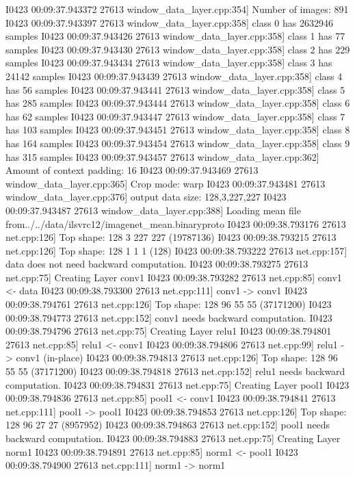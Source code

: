 \documentclass{article}
\begin{document}
I0423 00:09:37.943372 27613 window_data_layer.cpp:354] Number of images: 891
I0423 00:09:37.943397 27613 window_data_layer.cpp:358] class 0 has 2632946 samples
I0423 00:09:37.943426 27613 window_data_layer.cpp:358] class 1 has 77 samples
I0423 00:09:37.943430 27613 window_data_layer.cpp:358] class 2 has 229 samples
I0423 00:09:37.943434 27613 window_data_layer.cpp:358] class 3 has 24142 samples
I0423 00:09:37.943439 27613 window_data_layer.cpp:358] class 4 has 56 samples
I0423 00:09:37.943441 27613 window_data_layer.cpp:358] class 5 has 285 samples
I0423 00:09:37.943444 27613 window_data_layer.cpp:358] class 6 has 62 samples
I0423 00:09:37.943447 27613 window_data_layer.cpp:358] class 7 has 103 samples
I0423 00:09:37.943451 27613 window_data_layer.cpp:358] class 8 has 164 samples
I0423 00:09:37.943454 27613 window_data_layer.cpp:358] class 9 has 315 samples
I0423 00:09:37.943457 27613 window_data_layer.cpp:362] Amount of context padding: 16
I0423 00:09:37.943469 27613 window_data_layer.cpp:365] Crop mode: warp
I0423 00:09:37.943481 27613 window_data_layer.cpp:376] output data size: 128,3,227,227
I0423 00:09:37.943487 27613 window_data_layer.cpp:388] Loading mean file from../../data/ilsvrc12/imagenet_mean.binaryproto
I0423 00:09:38.793176 27613 net.cpp:126] Top shape: 128 3 227 227 (19787136)
I0423 00:09:38.793215 27613 net.cpp:126] Top shape: 128 1 1 1 (128)
I0423 00:09:38.793222 27613 net.cpp:157] data does not need backward computation.
I0423 00:09:38.793275 27613 net.cpp:75] Creating Layer conv1
I0423 00:09:38.793282 27613 net.cpp:85] conv1 <- data
I0423 00:09:38.793300 27613 net.cpp:111] conv1 -> conv1
I0423 00:09:38.794761 27613 net.cpp:126] Top shape: 128 96 55 55 (37171200)
I0423 00:09:38.794773 27613 net.cpp:152] conv1 needs backward computation.
I0423 00:09:38.794796 27613 net.cpp:75] Creating Layer relu1
I0423 00:09:38.794801 27613 net.cpp:85] relu1 <- conv1
I0423 00:09:38.794806 27613 net.cpp:99] relu1 -> conv1 (in-place)
I0423 00:09:38.794813 27613 net.cpp:126] Top shape: 128 96 55 55 (37171200)
I0423 00:09:38.794818 27613 net.cpp:152] relu1 needs backward computation.
I0423 00:09:38.794831 27613 net.cpp:75] Creating Layer pool1
I0423 00:09:38.794836 27613 net.cpp:85] pool1 <- conv1
I0423 00:09:38.794841 27613 net.cpp:111] pool1 -> pool1
I0423 00:09:38.794853 27613 net.cpp:126] Top shape: 128 96 27 27 (8957952)
I0423 00:09:38.794863 27613 net.cpp:152] pool1 needs backward computation.
I0423 00:09:38.794883 27613 net.cpp:75] Creating Layer norm1
I0423 00:09:38.794891 27613 net.cpp:85] norm1 <- pool1
I0423 00:09:38.794900 27613 net.cpp:111] norm1 -> norm1
\end{document}
